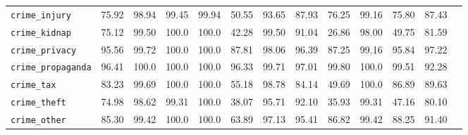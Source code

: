 \begin{table}[h!]
{\begin{tabular}{l|c|ccccccccccc}
\texttt{crime\_injury} &\colorbox{Red!30}{75.92}& \colorbox{Orange!50}{98.94} & \colorbox{Sand!20}{99.45} & \colorbox{Sand!20}{99.94} & \colorbox{Red!30}{50.55} & \colorbox{Orange!50}{93.65} & \colorbox{Red!30}{87.93} & \colorbox{Red!30}{76.25} & \colorbox{Sand!20}{99.16} & \colorbox{Red!30}{75.80} & \colorbox{Red!30}{87.43}\\

\texttt{crime\_kidnap} &\colorbox{Red!30}{75.12}& \colorbox{Sand!20}{99.50} & \colorbox{Sand!20}{100.0} & \colorbox{Sand!20}{100.0} & \colorbox{Red!30}{42.28} & \colorbox{Sand!20}{99.50} & \colorbox{Orange!50}{91.04} & \colorbox{Red!30}{26.86} & \colorbox{Orange!50}{98.00} & \colorbox{Red!30}{49.75} & \colorbox{Red!30}{81.59}\\

\texttt{crime\_privacy} &\colorbox{Orange!50}{95.56}& \colorbox{Sand!20}{99.72} & \colorbox{Sand!20}{100.0} & \colorbox{Sand!20}{100.0} & \colorbox{Red!30}{87.81} & \colorbox{Orange!50}{98.06} & \colorbox{Orange!50}{96.39} & \colorbox{Red!30}{87.25} & \colorbox{Sand!20}{99.16} & \colorbox{Orange!50}{95.84} & \colorbox{Orange!50}{97.22}\\

\texttt{crime\_propaganda}&\colorbox{Orange!50}{96.41} & \colorbox{Sand!20}{100.0} & \colorbox{Sand!20}{100.0} & \colorbox{Sand!20}{100.0} & \colorbox{Orange!50}{96.33} & \colorbox{Sand!20}{99.71} & \colorbox{Orange!50}{97.01} & \colorbox{Sand!20}{99.80} & \colorbox{Sand!20}{100.0} & \colorbox{Sand!20}{99.51} & \colorbox{Orange!50}{92.28}\\

\texttt{crime\_tax} &\colorbox{Red!30}{83.23}& \colorbox{Sand!20}{99.69} & \colorbox{Sand!20}{100.0} & \colorbox{Sand!20}{100.0} & \colorbox{Red!30}{55.18} & \colorbox{Orange!50}{98.78} & \colorbox{Red!30}{84.14} & \colorbox{Red!30}{49.69} & \colorbox{Sand!20}{100.0} & \colorbox{Red!30}{86.89} & \colorbox{Red!30}{89.63}\\

\texttt{crime\_theft} &\colorbox{Red!30}{74.98}& \colorbox{Orange!50}{98.62} & \colorbox{Sand!20}{99.31} & \colorbox{Sand!20}{100.0} & \colorbox{Red!30}{38.07} & \colorbox{Orange!50}{95.71} & \colorbox{Orange!50}{92.10} & \colorbox{Red!30}{35.93} & \colorbox{Sand!20}{99.31} & \colorbox{Red!30}{47.16} & \colorbox{Red!30}{80.10}\\

\texttt{crime\_other}&\colorbox{Red!30}{85.30} & \colorbox{Sand!20}{99.42} & \colorbox{Sand!20}{100.0} & \colorbox{Sand!20}{100.0} & \colorbox{Red!30}{63.89} & \colorbox{Orange!50}{97.13} & \colorbox{Orange!50}{95.41} & \colorbox{Red!30}{86.82} & \colorbox{Sand!20}{99.42} & \colorbox{Red!30}{88.25} & \colorbox{Orange!50}{91.40}\\


\end{tabular}}
\end{table}

